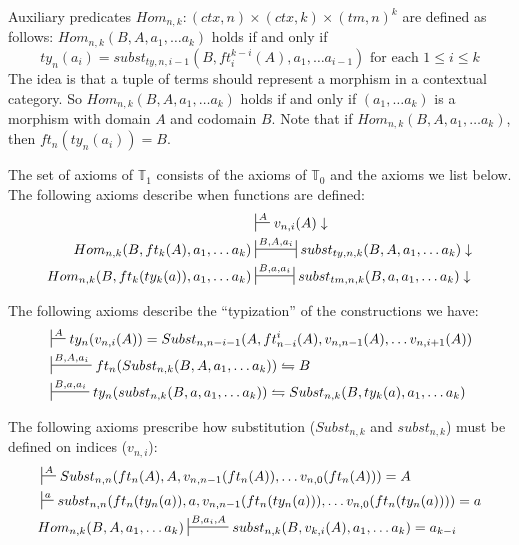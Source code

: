 \documentclass[reqno]{amsart}
\theoremstyle{definition}
\theoremstyle{remark}
\numberwithin{figure}{section}
\begin{document}
Auxiliary predicates $Hom_{n,k} : (ctx,n) \times (ctx,k) \times (tm,n)^k$ are defined as follows: $Hom_{n,k}(B, A, a_1, \ldots a_k)$ holds if and only if
\[ ty_n(a_i) = subst_{ty,n,i-1}(B, ft^{k-i}_i(A), a_1, \ldots a_{i-1}) \text{ for each } 1 \leq i \leq k \]
The idea is that a tuple of terms should represent a morphism in a contextual category.
So $Hom_{n,k}(B, A, a_1, \ldots a_k)$ holds if and only if $(a_1, \ldots a_k)$ is a morphism with domain $A$ and codomain $B$.
Note that if $Hom_{n,k}(B, A, a_1, \ldots a_k)$, then $ft_n(ty_n(a_i)) = B$.

The set of axioms of $\mathbb{T}_1$ consists of the axioms of $\mathbb{T}_0$ and the axioms we list below.
The following axioms describe when functions are defined:
\begin{align}
\label{ax:def-var}
                                             & \sststile{}{A}           v_{n,i}(A) \downarrow \\
\label{ax:def-Subst}
Hom_{n,k}(B, ft_k(A), a_1, \ldots a_k)       & \ssststile{}{B, A, a_i}  subst_{ty,n,k}(B, A, a_1, \ldots a_k) \downarrow \\
\label{ax:def-subst}
Hom_{n,k}(B, ft_k(ty_k(a)), a_1, \ldots a_k) & \ssststile{}{B, a, a_i}  subst_{tm,n,k}(B, a, a_1, \ldots a_k) \downarrow
\end{align}

The following axioms describe the ``typization'' of the constructions we have:
\begin{align}
\label{ax:type-var}
& \sststile{}{A}         ty_n(v_{n,i}(A)) = Subst_{n,n-i-1}(A, ft^i_{n-i}(A), v_{n,n-1}(A), \ldots v_{n,i+1}(A)) \\
\label{ax:type-Subst}
& \sststile{}{B, A, a_i} ft_n(Subst_{n,k}(B, A, a_1, \ldots a_k)) \leftrightharpoons B \\
\label{ax:type-subst}
& \sststile{}{B, a, a_i} ty_n(subst_{n,k}(B, a, a_1, \ldots a_k)) \leftrightharpoons Subst_{n,k}(B, ty_k(a), a_1, \ldots a_k)
\end{align}

The following axioms prescribe how substitution ($Subst_{n,k}$ and $subst_{n,k}$) must be defined on indices ($v_{n,i}$):
\begin{align}
\label{ax:Subst-var}
& \sststile{}{A}         Subst_{n,n}(ft_n(A), A, v_{n,n-1}(ft_n(A)), \ldots v_{n,0}(ft_n(A))) = A \\
\label{ax:subst-var}
& \sststile{}{a}         subst_{n,n}(ft_n(ty_n(a)), a, v_{n,n-1}(ft_n(ty_n(a))), \ldots v_{n,0}(ft_n(ty_n(a)))) = a \\
\label{ax:var-subst}
& Hom_{n,k}(B, A, a_1, \ldots a_k) \sststile{}{B, a_i, A} subst_{n,k}(B, v_{k,i}(A), a_1, \ldots a_k) = a_{k-i}
\end{align}
\end{document}
